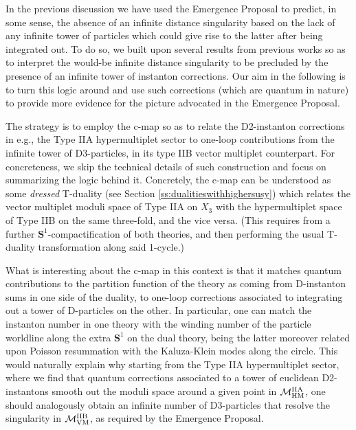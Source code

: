 In the previous discussion we have used the Emergence Proposal to predict, in some sense, the absence of an infinite distance singularity based on the lack of any infinite tower of particles which could give rise to the latter after being integrated out. To do so, we built upon several results from previous works so as to interpret the would-be infinite distance singularity to be precluded by the presence of an infinite tower of instanton corrections. Our aim in the following is to turn this logic around and use such corrections (which are quantum in nature) to provide more evidence for the picture advocated in the Emergence Proposal.
		
The strategy is to employ the c-map \cite{Cecotti:1988qn,Ferrara:1989ik} so as to relate the D2-instanton corrections in e.g., the Type IIA hypermultiplet sector to one-loop contributions from the infinite tower of D3-particles, in its type IIB vector multiplet counterpart. For concreteness, we skip the technical details of such construction and focus on summarizing the logic behind it. Concretely, the c-map can be understood as some \emph{dressed} T-duality (see Section \ref{ss:dualitieswithhighersusy}) which relates the vector multiplet moduli space of Type IIA on $X_3$ with the hypermultiplet space of Type IIB on the same three-fold, and the vice versa. (This requires from a further $\mathbf{S}^1$-compactification of both theories, and then performing the usual T-duality transformation along said 1-cycle.)
		
What is interesting about the c-map in this context is that it matches quantum contributions to the partition function of the theory as coming from D-instanton sums in one side of the duality, to one-loop corrections associated to integrating out a tower of D-particles on the other. In particular, one can match the instanton number in one theory with the winding number of the particle worldline along the extra $\mathbf{S}^1$ on the dual theory, being the latter moreover related upon Poisson resummation with the Kaluza-Klein modes along the circle. %
This would naturally explain why starting from the Type IIA hypermultiplet sector, where we find that quantum corrections associated to a tower of euclidean D2-instantons smooth out the moduli space around a given point in ${\cal M}_{\rm HM}^{\rm IIA}$, one should analogously obtain an infinite number of D3-particles that resolve the singularity in ${\cal M}_{\rm VM}^{\rm IIB}$, as required by the Emergence Proposal.
		
